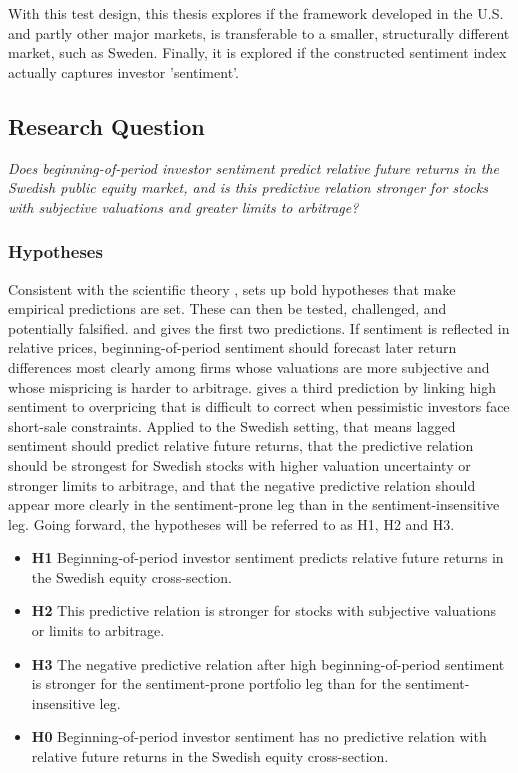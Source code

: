 \documentclass[11pt]{article}
\begin{document}
\newpage

With this test design, this thesis explores if the framework developed in the U.S. and partly other major markets, is transferable to a smaller, structurally different market, such as Sweden. Finally, it is explored if the constructed sentiment index actually captures investor 'sentiment'.

\subsection{Research Question}
\begin{displayquote}
\textit{Does beginning-of-period investor sentiment predict relative future returns in the Swedish public equity market, and is this predictive relation stronger for stocks with subjective valuations and greater limits to arbitrage?}
\end{displayquote}

\subsubsection{Hypotheses}
Consistent with the scientific theory \citet{popper1959scientificdiscovery}, sets up bold hypotheses that make empirical predictions are set. These can then be tested, challenged, and potentially falsified. \citet{baker2006sentiment} and \citet{baker2007} gives the first two predictions. If sentiment is reflected in relative prices, beginning-of-period sentiment should forecast later return differences most clearly among firms whose valuations are more subjective and whose mispricing is harder to arbitrage. \citet{stambaugh2012short} gives a third prediction by linking high sentiment to overpricing that is difficult to correct when pessimistic investors face short-sale constraints. Applied to the Swedish setting, that means lagged sentiment should predict relative future returns, that the predictive relation should be strongest for Swedish stocks with higher valuation uncertainty or stronger limits to arbitrage, and that the negative predictive relation should appear more clearly in the sentiment-prone leg than in the sentiment-insensitive leg. Going forward, the hypotheses will be referred to as H1, H2 and H3. 

\begin{itemize}
    \item \textbf{H1} Beginning-of-period investor sentiment predicts relative future returns in the Swedish equity cross-section.
    \item \textbf{H2} This predictive relation is stronger for stocks with subjective valuations or limits to arbitrage.
    \item \textbf{H3} The negative predictive relation after high beginning-of-period sentiment is stronger for the sentiment-prone portfolio leg than for the sentiment-insensitive leg.
    \item \textbf{H0} Beginning-of-period investor sentiment has no predictive relation with relative future returns in the Swedish equity cross-section.
\end{itemize}
\end{document}
